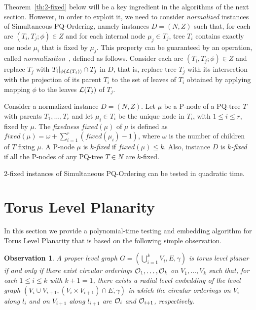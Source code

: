 \documentclass{llncs}
\newtheorem{observation}{Observation}
\begin{document}
Theorem~\ref{th:2-fixed} below will be a key ingredient in the algorithms of the next section. However, in order to exploit it, we need to consider {\em normalized} instances of {\sc Simultaneous PQ-Ordering}, namely instances $D=(N,Z)$ such that, for each arc $(T_i,T_j;\phi) \in Z$ and for each internal node $\mu_j \in T_j$, tree $T_i$ contains exactly one node $\mu_i$ that is fixed by $\mu_j$. This property can be guaranteed by an operation, called {\em normalization}~\cite{br-spacep-13}, defined as follows. Consider each arc $(T_i,T_j;\phi) \in Z$ and replace $T_j$ with $T_i|_{\phi({\cal L}(T_j))} \cap T_j$ in $D$, that is, replace tree $T_j$ with its intersection with the projection of its parent $T_i$ to the set of leaves of $T_i$ obtained by applying mapping $\phi$ to the leaves ${\cal L}(T_j)$ of $T_j$. 

Consider a normalized instance $D=(N,Z)$.
Let $\mu$ be a P-node of a PQ-tree $T$ with parents $T_1,\dots,T_r$ and let $\mu_i \in T_i$ be the unique node in $T_i$, with $1 \leq i \leq r$, fixed by $\mu$. The {\em fixedness} $fixed(\mu)$ of $\mu$ is defined as $fixed(\mu) = \omega + \sum^r_{i=1} (fixed(\mu_i)-1)$, where $\omega$ is the number of children of $T$ fixing $\mu$. A P-node $\mu$ is \emph{$k$-fixed} if $fixed(\mu) \leq k$. Also, instance $D$ is \emph{$k$-fixed} if all the P-nodes of any PQ-tree $T \in N$ are $k$-fixed. 

\begin{theorem}\label{th:2-fixed} $2$-fixed instances of {\sc Simultaneous PQ-Ordering} can be tested in quadratic time.
\end{theorem}
 


\section{Torus Level Planarity} \label{se:cyclic}

In this section we provide a polynomial-time testing and embedding algorithm for {\sc Torus Level Planarity} that is based on the following simple observation.

\begin{observation}\label{prop:characterization}
A proper level graph $G=(\bigcup^k_{i=1}V_i,E,\gamma)$ is torus level planar if and only if 
there exist circular orderings ${\cal O}_1,\dots,{\cal O}_k$ on $V_1,\dots,V_k$
such that, for each $1 \leq i \leq k$ with $k+1=1$, there exists a radial level embedding of the level graph $(V_i \cup V_{i+1},(V_i \times V_{i+1}) \cap E,\gamma)$ in which the circular orderings on $V_i$ along $l_i$ and on $V_{i+1}$ along $l_{i+1}$ are ${\cal O}_i$ and ${\cal O}_{i+1}$, respectively.
\end{observation}
\end{document}
